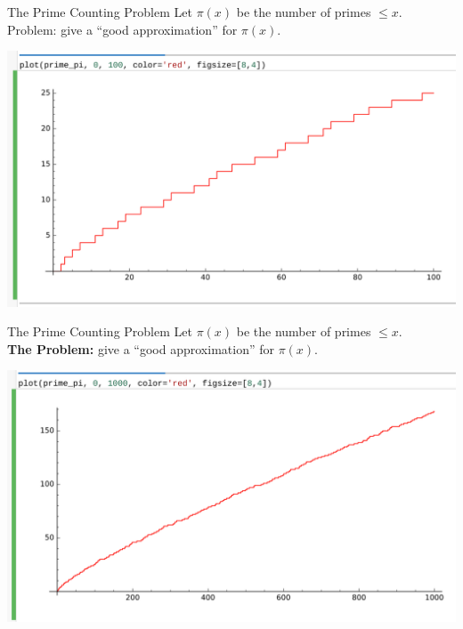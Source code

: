 \documentclass{beamer}
\begin{document}
\begin{frame}{The Prime Counting Problem}
  Let $\pi(x)$ be the number of primes $\leq x$.\\
  Problem: give a ``good approximation'' for $\pi(x)$.
  \vfill

  \includegraphics[width=.98\textwidth]{pics/prime-pi-100.png}

\end{frame}

\begin{frame}{The Prime Counting Problem}
  Let $\pi(x)$ be the number of primes $\leq x$.\\
  \textbf{The Problem:} give a ``good approximation'' for $\pi(x)$.
  \vfill

  \includegraphics[width=.98\textwidth]{pics/prime-pi-1000.png}

\end{frame}
\end{document}
